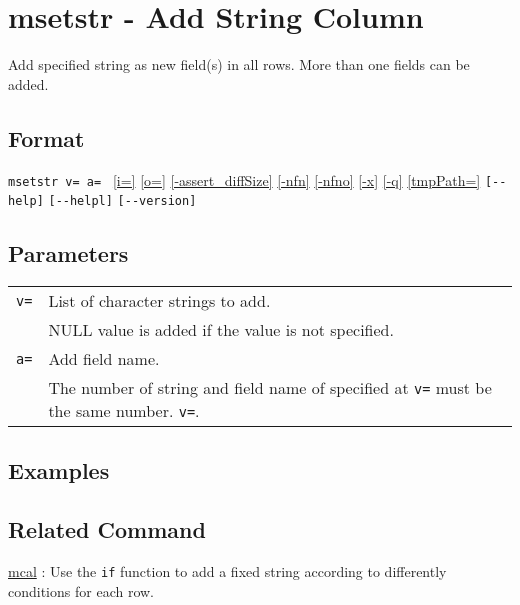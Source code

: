 
%

\section{msetstr - Add String Column\label{sect:msetstr}}
Add specified string as new field(s) in all rows. More than one fields can be added.


\subsection*{Format}
\verb|msetstr v= a= |
\hyperref[sect:option_i]{[i=]}
\hyperref[sect:option_o]{[o=]}
\hyperref[sect:option_assert_diffSize]{[-assert\_diffSize]}
\hyperref[sect:option_nfn]{[-nfn]} 
\hyperref[sect:option_nfno]{[-nfno]}  
\hyperref[sect:option_x]{[-x]}
\hyperref[sect:option_q]{[-q]}
\hyperref[sect:option_option_tmppath]{[tmpPath=]}
\verb|[--help]|
\verb|[--helpl]|
\verb|[--version]|\\

\subsection*{Parameters}
\begin{table}[htbp]
{\small
\begin{tabular}{ll}
\verb|v=| & List of character strings to add.  \\
          & NULL value is added if the value is not specified.\\
\verb|a=| & Add field name.\\
          & The number of string and field name of specified at \verb|v=| must be the same number. \verb|v=|.\\
\end{tabular}
}
\end{table}


\subsection*{Examples}

\subsection*{Related Command}
\hyperref[sect:mcal]{mcal} : Use the \verb|if|  function to add a fixed string  according to differently conditions for each row.

%

